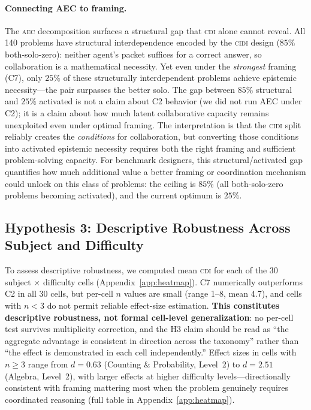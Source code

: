 \documentclass{article}
\newcommand{\CDI}{\textsc{cdi}}
\newcommand{\CIDI}{\textsc{cidi}}
\newcommand{\AEC}{\textsc{aec}}
\begin{document}
\paragraph{Connecting AEC to framing.}
The \AEC{} decomposition surfaces a structural gap that \CDI{} alone
cannot reveal. All 140 problems have structural interdependence encoded
by the \CIDI{} design ($85\%$ both-solo-zero): neither agent's packet
suffices for a correct answer, so collaboration is a mathematical
necessity. Yet even under the \emph{strongest} framing (C7), only
$25\%$ of these structurally interdependent problems achieve epistemic
necessity---the pair surpasses the better solo. The gap between $85\%$
structural and $25\%$ activated is not a claim about C2 behavior (we
did not run AEC under C2); it is a claim about how much latent
collaborative capacity remains unexploited even under optimal framing.
The interpretation is that the \CIDI{} split reliably creates the
\emph{conditions} for collaboration, but converting those conditions
into activated epistemic necessity requires both the right framing and
sufficient problem-solving capacity. For benchmark designers, this
structural/activated gap quantifies how much additional value a better
framing or coordination mechanism could unlock on this class of
problems: the ceiling is $85\%$ (all both-solo-zero problems becoming
activated), and the current optimum is $25\%$.

\subsection{Hypothesis 3: Descriptive Robustness Across Subject and Difficulty}

To assess descriptive robustness, we computed mean \CDI{} for each of
the 30 subject $\times$ difficulty cells (Appendix~\ref{app:heatmap}).
C7 numerically outperforms C2 in all 30 cells, but per-cell $n$ values
are small (range 1--8, mean 4.7), and cells with $n < 3$ do not permit
reliable effect-size estimation. \textbf{This constitutes descriptive
robustness, not formal cell-level generalization}: no per-cell test
survives multiplicity correction, and the H3 claim should be read as
``the aggregate advantage is consistent in direction across the
taxonomy'' rather than ``the effect is demonstrated in each cell
independently.'' Effect sizes in cells with $n \geq 3$ range from
$d = 0.63$ (Counting \& Probability, Level~2) to $d = 2.51$ (Algebra,
Level~2), with larger effects at higher difficulty levels---directionally
consistent with framing mattering most when the problem genuinely
requires coordinated reasoning (full table in Appendix~\ref{app:heatmap}).
\end{document}
